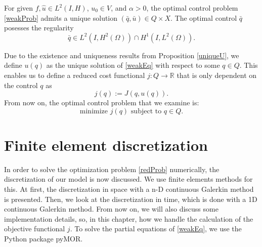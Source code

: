 \begin{prop}
For given $f,\hat{u}\in L^2(I,H)$, $u_0\in V$, and $\alpha>0$, the optimal control problem \eqref{weakProb} admits a unique solution $(\bar{q},\bar{u})\in Q\times X$. The optimal control $\bar{q}$ posesses the regularity
\begin{displaymath}
\bar{q}\in L^2(I,H^2(\Omega))\cap H^1(I,L^2(\Omega)).
\end{displaymath}
\end{prop}

Due to the existence and uniqueness results from Proposition \ref{uniqueU}, we define $u(q)$ as the unique solution of \eqref{weakEq} with respect to some $q\in Q$. This enables us to define a reduced cost functional $j:Q\to \mathbb{R}$ that is only dependent on the control $q$ as
\begin{displaymath}
j(q):=J(q,u(q)).
\end{displaymath}
From now on, the optimal control problem that we examine is:
\begin{equation}
\label{redProb}
\text{minimize }j(q)\text{ subject to }q\in Q.
\end{equation}

\section{Finite element discretization}
In order to solve the optimization problem \eqref{redProb} numerically, the discretization of our model is now discussed. We use finite elements methods \cite{doi:10.1137/1.9780898717440, articleMeidner} for this. At first, the discretization in space with a n-D continuous Galerkin method is presented. Then, we look at the discretization in time, which is done with a 1D continuous Galerkin method. From now on, we will also discuss some implementation details, so, in this chapter, how we handle the calculation of the objective functional $j$. To solve the partial equations of \eqref{weakEq}, we use the Python package pyMOR.

